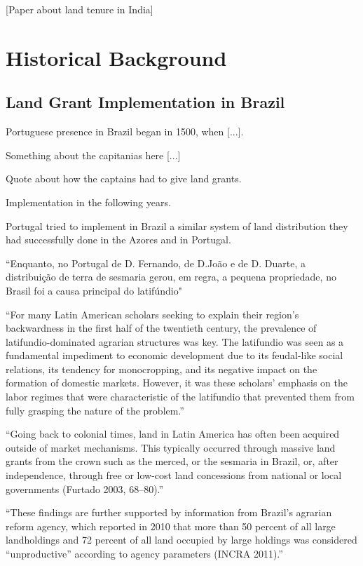 \documentclass{article}
\begin{document}
\textcite{Ratnoo2023-vw} [Paper about land tenure in India]

\textcite{Albertus2018-bf}


\section{Historical Background}

\subsection{Land Grant Implementation in Brazil}

Portuguese presence in Brazil began in 1500, when [...].

Something about the capitanias here [...] 

Quote about how the captains had to give land grants. 

Implementation in the following years.

Portugal tried to implement in Brazil a similar system of land distribution they had successfully done in the Azores and in Portugal.

\textcite[p.~58-59]{Da_Costa_Porto1979-dz} ``Enquanto, no Portugal de D. Fernando, de D.João e de D. Duarte, a distribuição de terra de sesmaria gerou, em regra, a pequena propriedade, no Brasil foi a causa principal do latifúndio"

\parencite{Carlson2019-mk}
``For many Latin American scholars seeking to explain their region’s backwardness in the first half of the  twentieth century, the prevalence of latifundio-dominated agrarian structures was key. The latifundio was  seen  as a  fundamental  impediment  to  economic  development  due  to  its  feudal-like  social  relations,  its   tendency for monocropping, and its negative impact on the formation of domestic markets. However, it  was these scholars’ emphasis on the labor regimes that were characteristic of the latifundio that prevented  them from fully grasping the nature of the problem.''

\parencite{Carlson2019-mk}
``Going back to colonial times, land in Latin America has often been acquired outside of market mechanisms.  This typically occurred through massive land grants from the crown such as the merced, or the sesmaria in  Brazil, or, after independence, through free or low-cost land concessions from national or local governments  (Furtado  2003,  68–80).''

\parencite{Carlson2019-mk}
``These findings are further supported by information from Brazil’s agrarian reform 
agency, which reported in 2010 that more than 50 percent of all large landholdings and 72 percent of all  land  occupied  by  large  holdings  was  considered  “unproductive”  according  to  agency  parameters  (INCRA   2011).''
\end{document}
